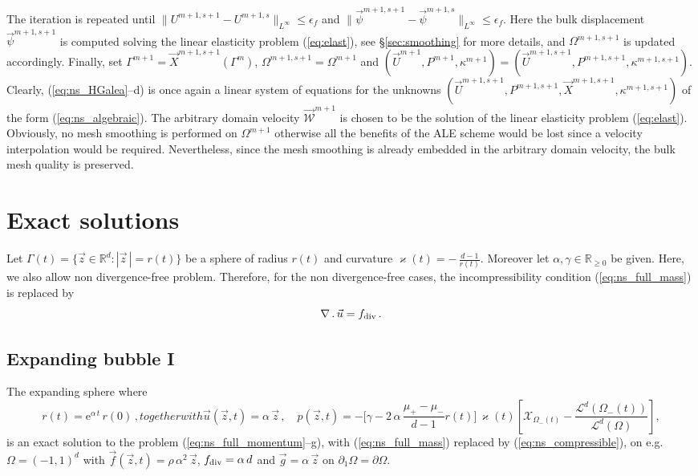 \documentclass[a4paper,12pt,onecolumn]{article}
\newcommand{\R}{\mathbb R}
\newcommand{\W}{\vec{\mathcal W}}
\newcommand{\vol}{\mathcal{L}^d}
\newcommand{\bigchi}{\ensuremath{\mathrm{\mathcal{X}}}}
\newcommand{\charfcn}[1]{\bigchi_{#1}} %
\begin{document}
The iteration is repeated until $\|U^{m+1,s+1}-U^{m+1,s}\|_{L^\infty}
\leq\epsilon_f$ and $\|\vec \psi^{m+1,s+1}-\vec \psi^{m+1,s}\|_{L^\infty}
\leq\epsilon_f$. Here the bulk displacement $\vec \psi^{m+1,s+1}$ is computed
solving the linear elasticity problem (\ref{eq:elast}), see
\S\ref{sec:smoothing} for more details, and $\Omega^{m+1,s+1}$ is
updated accordingly. Finally, set
$\Gamma^{m+1} = \vec X^{m+1,s+1}(\Gamma^m)$, $\Omega^{m+1,s+1}=\Omega^{m+1}$
and $(\vec U^{m+1}, P^{m+1}, \kappa^{m+1}) = (\vec U^{m+1,s+1}, P^{m+1,s+1},
\kappa^{m+1,s+1})$. Clearly, (\ref{eq:ns_HGalea}--d) is once again
a linear system of equations for the unknowns \linebreak
$(\vec U^{m+1,s+1}, P^{m+1,s+1}, \vec X^{m+1,s+1},
\kappa^{m+1,s+1})$ of the form (\ref{eq:ns_algebraic}). The
arbitrary domain velocity $\W^{m+1}$ is chosen to be the solution of the linear
elasticity problem (\ref{eq:elast}). Obviously, no mesh smoothing is
performed on $\Omega^{m+1}$ otherwise all the benefits of the ALE scheme would
be lost since a velocity interpolation would be required. Nevertheless, since
the mesh smoothing is already embedded in the arbitrary domain velocity, the
bulk mesh quality is preserved.

\section{Exact solutions}\label{sec:ns_exact_solutions}
Let $\Gamma(t) = \{ \vec z \in \R^d : |\vec z\,| = r(t)\}$ be a sphere of radius
$r(t)$ and curvature $\varkappa(t) = -\,\frac{d-1}{r(t)}$. Moreover let
$\alpha,\gamma\in \R_{\geq 0}$ be given. Here, we also allow
non divergence-free problem. Therefore, for the non divergence-free cases, the
incompressibility condition (\ref{eq:ns_full_mass}) is replaced by
\begin{equation}\label{eq:ns_compressible}
\nabla\,.\,\vec u = f_{\rm{div}}\,.
\end{equation}

\subsection{Expanding bubble I}\label{sec:exp1}
The expanding sphere where
\begin{subequations}
\begin{equation} \label{eq:ns_sol_1_r}
r(t) = \mathrm{e}^{\alpha\,t}\,r(0)\,,
\end{equation}
together with
\begin{equation} \label{eq:ns_sol_1_up}
\vec u(\vec z, t) = \alpha\,\vec z \,, \quad
p(\vec z, t) = -\bigg[\gamma - 2\,\alpha\,\frac{\mu_+ - \mu_-}
{d-1}r(t)\bigg]\,\varkappa(t)\left[ \charfcn{\Omega_-(t)} -
\frac{\vol(\Omega_-(t))}{\vol(\Omega)}\right],
\end{equation}
\end{subequations}
is an exact solution to the problem (\ref{eq:ns_full_momentum}--g), with
(\ref{eq:ns_full_mass}) replaced by (\ref{eq:ns_compressible}), on
e.g.\ $\Omega = (-1,1)^d$  with $\vec f(\vec z, t) = \rho\,\alpha^2\,\vec z$,
$f_{\rm{div}} = \alpha\,d$ and $\vec g = \alpha\,\vec z$ on
$\partial_1\Omega=\partial\Omega$.
\end{document}
